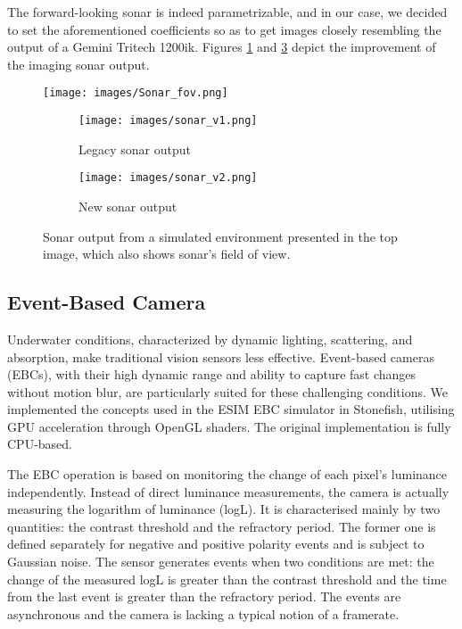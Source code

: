 The forward-looking sonar is indeed parametrizable, and in our case, we decided to set the aforementioned coefficients so as to get images closely resembling the output of a Gemini Tritech 1200ik. Figures \ref{fig:1A} and \ref{fig:1B} depict the improvement of the imaging sonar output.

\begin{figure}[t] 
\centering
    \texttt{[image: images/Sonar\_fov.png]}
    
        \vspace{0.1cm}
        
\centering
	\begin{subfigure}[t]{.48\linewidth}
		\texttt{[image: images/sonar\_v1.png]}
		\caption{Legacy sonar output}
		\label{fig:1A}
	\end{subfigure}
    \hfill
	\begin{subfigure}[t]{.48\linewidth}
		\texttt{[image: images/sonar\_v2.png]} 
		\caption{New sonar output} 
		\label{fig:1B}
	\end{subfigure}
    \caption{Sonar output from a simulated environment presented in the top image, which also shows sonar's field of view.}

\end{figure}
\subsection{Event-Based Camera}
Underwater conditions, characterized by dynamic lighting, scattering, and absorption, make traditional vision sensors less effective. Event-based cameras (EBCs), with their high dynamic range and ability to capture fast changes without motion blur, are particularly suited for these challenging conditions. We implemented the concepts used in the ESIM \cite{Rebecq18corl} EBC simulator in Stonefish, utilising GPU acceleration through OpenGL shaders. The original implementation is fully CPU-based.

The EBC operation is based on monitoring the change of each pixel's luminance independently. Instead of direct luminance measurements, the camera is actually measuring the logarithm of luminance (logL). It is characterised mainly by two quantities: the contrast threshold and the refractory period. The former one is defined separately for negative and positive polarity events and is subject to Gaussian noise. The sensor generates events when two conditions are met: the change of the measured logL is greater than the contrast threshold and the time from the last event is greater than the refractory period. The events are asynchronous and the camera is lacking a typical notion of a framerate.

